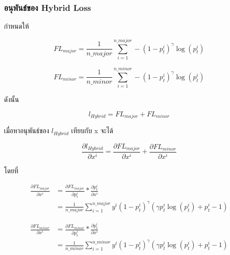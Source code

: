\subsubsection{อนุพันธ์ของ Hybrid Loss}
กำหนดให้

\begin{equation}
    FL_{major} = \frac{1}{n\_major} \sum_{i = 1}^{n\_major} - (1 - p_{t}^{i})^{\gamma}\log (p_{t}^{i})
\end{equation}

\begin{equation}
    FL_{minor} = \frac{1}{n\_minor} \sum_{i = 1}^{n\_minor} - (1 - p_{t}^{i})^{\gamma}\log (p_{t}^{i})
\end{equation}

ดังนั้น

\begin{equation}
    l_{Hybrid} = FL_{major} + FL_{minor}
\end{equation}

เมื่อหาอนุพันธ์ของ $l_{Hybrid}$ เทียบกับ x จะได้

\begin{equation}
\frac{\partial l_{Hybrid}}{\partial x^{i}} = \frac{\partial FL_{major}}{\partial x^{i}} + \frac{\partial FL_{minor}}{\partial x^{i}}
\end{equation}

โดยที่

\begin{equation} \label{fl_major_derivative}
\begin{split}
\frac{\partial FL_{major}}{\partial x^{i}} & = \frac{\partial FL_{major}}{\partial p_{t}^{i}} * \frac{\partial p_{t}^{i}}{\partial x^{i}} \\
& = \frac{1}{n\_major} \sum_{i = 1}^{n\_major} y^{i} (1 - p_{t}^{i})^{\gamma} (\gamma p_{t}^{i} \log (p_{t}^{i}) + p_{t}^{i} - 1)
\end{split}
\end{equation}

\begin{equation} \label{fl_minor_derivative}
\begin{split}
\frac{\partial FL_{minor}}{\partial x^{i}} & = \frac{\partial FL_{minor}}{\partial p_{t}^{i}} * \frac{\partial p_{t}^{i}}{\partial x^{i}} \\
& = \frac{1}{n\_minor} \sum_{i = 1}^{n\_minor} y^{i} (1 - p_{t}^{i})^{\gamma} (\gamma p_{t}^{i} \log (p_{t}^{i}) + p_{t}^{i} - 1)
\end{split}
\end{equation}

